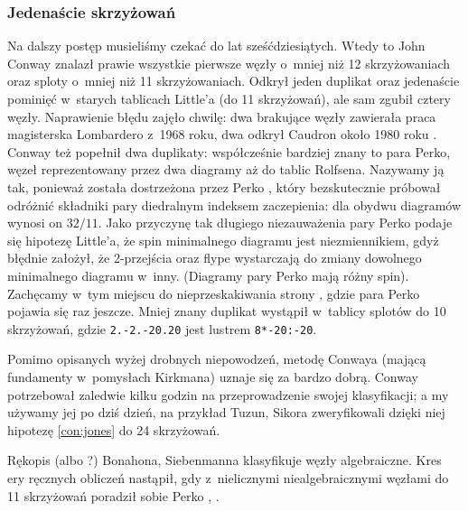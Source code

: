 
\subsubsection{Jedenaście skrzyżowań}
Na dalszy postęp musieliśmy czekać do lat sześćdziesiątych.
Wtedy to John Conway \cite{conway1970} znalazł prawie wszystkie pierwsze węzły o~mniej niż 12 skrzyżowaniach oraz sploty o~mniej niż 11 skrzyżowaniach.
%
Odkrył jeden duplikat oraz jedenaście pominięć w~starych tablicach Little'a (do 11 skrzyżowań), ale sam zgubił cztery węzły.
Naprawienie błędu zajęło chwilę: dwa brakujące węzły zawierała praca magisterska Lombardero z~1968 roku, dwa odkrył Caudron około 1980 roku \cite{caudron1982}.
%
%
Conway też popełnił dwa duplikaty: współcześnie bardziej znany to para Perko, węzeł reprezentowany przez dwa diagramy aż do tablic Rolfsena.
%
Nazywamy ją tak, ponieważ została dostrzeżona przez Perko \cite{perko1974}, który bezskutecznie próbował odróżnić składniki pary diedralnym indeksem zaczepienia: dla obydwu diagramów wynosi on $32/11$.
%
Jako przyczynę tak długiego niezauważenia pary Perko podaje się hipotezę Little'a, że spin minimalnego diagramu jest niezmiennikiem, gdyż błędnie założył, że 2-przejścia oraz flype wystarczają do zmiany dowolnego minimalnego diagramu w~inny.
%
%
(Diagramy pary Perko mają różny spin).
Zachęcamy w~tym miejscu do nieprzeskakiwania strony \pageref{rolfsens_mistake}, gdzie para Perko pojawia się raz jeszcze.
Mniej znany duplikat wystąpił w~tablicy splotów do 10 skrzyżowań, gdzie \texttt{2.-2.-20.20} jest lustrem \texttt{8*-20:-20}.

Pomimo opisanych wyżej drobnych niepowodzeń, metodę Conwaya (mającą fundamenty w~pomysłach Kirkmana) uznaje się za bardzo dobrą.
Conway potrzebował zaledwie kilku godzin na przeprowadzenie swojej klasyfikacji; a my używamy jej po dziś dzień, na przykład Tuzun, Sikora zweryfikowali dzięki niej hipotezę \ref{con:jones} do 24 skrzyżowań.
%
%

Rękopis \cite{siebenmann1979} (albo \cite{bonahon1989}?) Bonahona, Siebenmanna klasyfikuje węzły algebraiczne.
%
%
Kres ery ręcznych obliczeń nastąpił, gdy z~nielicznymi niealgebraicznymi węzłami do 11 skrzyżowań poradził sobie Perko \cite{perko1980}, \cite{perko1982}.
%

